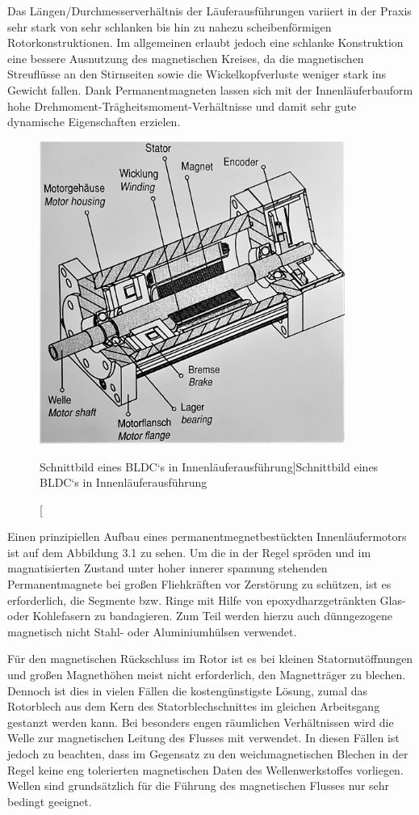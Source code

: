Das Längen/Durchmesserverhältnis der Läuferausführungen variiert in der Praxis sehr stark von sehr schlanken bis hin zu nahezu scheibenförmigen Rotorkonstruktionen. Im allgemeinen erlaubt jedoch eine schlanke Konstruktion eine bessere Ausnutzung des magnetischen Kreises, da die magnetischen Streuflüsse an den Stirnseiten sowie die Wickelkopfverluste weniger stark ins Gewicht fallen. Dank Permanentmagneten lassen sich mit der Innenläuferbauform hohe Drehmoment-Trägheitsmoment-Verhältnisse und damit sehr gute dynamische Eigenschaften erzielen.
\begin{figure}[H]
    \centering
    \includegraphics[width=10cm]{./Grafiken/3_1}
    \caption[Schnittbild eines BLDC`s in Innenläuferausführung]{Schnittbild eines BLDC`s in Innenläuferausführung \parencite[S. 75]{Stölting2011}}
    \label{fig:3_1}
  \end{figure}

Einen prinzipiellen Aufbau eines permanentmegnetbestückten Innenläufermotors ist auf dem Abbildung 3.1 zu sehen. Um die in der Regel spröden und im magnatisierten Zustand unter hoher innerer spannung stehenden Permanentmagnete bei großen Fliehkräften vor Zerstörung zu schützen, ist es erforderlich, die Segmente bzw. Ringe mit Hilfe von epoxydharzgetränkten Glas- oder Kohlefasern zu bandagieren. Zum Teil werden hierzu auch dünngezogene magnetisch nicht Stahl- oder Aluminiumhülsen verwendet.

Für den magnetischen Rückschluss im Rotor ist es bei kleinen Statornutöffnungen und großen Magnethöhen meist nicht erforderlich, den Magnetträger zu blechen. Dennoch ist dies in vielen Fällen die kostengünstigste Lösung, zumal das Rotorblech aus dem Kern des Statorblechschnittes im gleichen Arbeitsgang gestanzt werden kann. Bei besonders engen räumlichen Verhältnissen wird die Welle zur magnetischen Leitung des Flusses mit verwendet. In diesen Fällen ist jedoch zu beachten, dass im Gegensatz zu den weichmagnetischen Blechen in der Regel keine eng tolerierten magnetischen Daten des Wellenwerkstoffes vorliegen. Wellen sind grundsätzlich für die Führung des magnetischen Flusses nur sehr bedingt geeignet.


